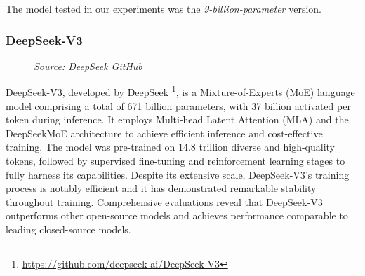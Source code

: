 The model tested in our experiments was the \emph{9-billion-parameter} version.

\vspace{1mm}
\subsubsection{DeepSeek-V3}
\begin{figure}
  \centering
  \def\stackalignment{l}
  {\scriptsize \parbox[t]{\linewidth}{\emph{Source: \href{https://github.com/deepseek-ai}{DeepSeek GitHub}}}}
\end{figure}
DeepSeek-V3, developed by DeepSeek \footnote{\url{https://github.com/deepseek-ai/DeepSeek-V3}},
is a Mixture-of-Experts (MoE) language model comprising a total of 671 billion parameters,
with 37 billion activated per token during inference. It employs Multi-head Latent
Attention (MLA) and the DeepSeekMoE architecture to achieve efficient inference and
cost-effective training. The model was pre-trained on 14.8 trillion diverse and
high-quality tokens, followed by supervised fine-tuning and reinforcement learning
stages to fully harness its capabilities. Despite its extensive scale, DeepSeek-V3's
training process is notably efficient and it has demonstrated remarkable stability
throughout training. Comprehensive evaluations reveal that DeepSeek-V3
outperforms other open-source models and achieves performance comparable to
leading closed-source models.

